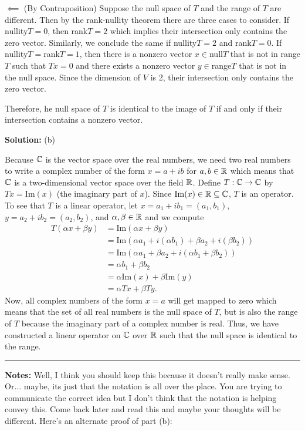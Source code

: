 \documentclass{article}
\begin{document}
	$\impliedby$ (By Contraposition) Suppose the null space of $T$ and the range of $T$ are different. Then by the rank-nullity theorem there are three cases
		to consider. If nullity$T = 0$, then rank$T = 2$ which implies their intersection only contains the zero vector. Similarly, we conclude the same if 
		nullity$T = 2$ and rank$T = 0$. If nullity$T =$rank$T = 1$, then there is a nonzero vector $x\in $null$T$ that is not in range$T$ such that $Tx=0$ and 
		there exists a nonzero vector $y\in$range$T$ that is not in the null space. Since the dimension of $V$ is 2, their intersection only contains the zero
		vector. 
		
	Therefore, he null space of $T$ is identical to the image of $T$ if and only if their intersection contains a nonzero vector. 
	
\textbf{Solution:} (b) 

	Because $\mathbb C$ is the vector space over the real numbers, we need two real numbers to write a complex number of the form $x = a+ib$ for $a,b\in\mathbb R$ which
	means that $\mathbb C$ is a two-dimensional vector space over the field $\mathbb R$. Define $T: \mathbb C \to \mathbb C$ by $Tx = \text{Im}(x)$ (the imaginary part of $x$). Since
	 $\text{Im}(x)\in\mathbb R\subseteq \mathbb C$, $T$ is an operator. To see that $T$ is a linear operator, let $x = a_1 + ib_1 = (a_1, b_1)$, $y = a_2 + ib_2 = (a_2, b_2)$, and
	  $\alpha, \beta\in\mathbb R$ and we compute 
	  	\begin{align*}
			T(\alpha x+ \beta y) & = \text{Im}(\alpha x+ \beta y)\\
						       & = \text{Im}(\alpha a_1 + i(\alpha b_1) + \beta a_2 + i (\beta b_2))\\
						       & = \text{Im}(\alpha a_1 + \beta a_2 + i(\alpha b_1 + \beta b_2))\\
						       & = \alpha b_1 + \beta b_2\\
						       & = \alpha \text{Im}(x) + \beta  \text{Im}(y)\\
						       & = \alpha Tx + \beta Ty.
		\end{align*}
	Now, all complex numbers of the form $x = a$ will get mapped to zero which means that the set of all real numbers is the null space of $T$, but is also the
	range of $T$ because the imaginary part of a complex number is real. Thus, we have constructed a linear operator on $\mathbb C$ over $\mathbb R$ such that the null space
	is identical to the range.\\
	
\hrule

\textbf{Notes:} Well, I think you should keep this because it doesn't really make sense. Or... maybe, its just that the notation is all over the place. You are trying to communicate the correct idea but I don't think that the notation is helping convey this. Come back later and read this and maybe your thoughts will be different. Here's an alternate proof of part (b):\\
\end{document}

